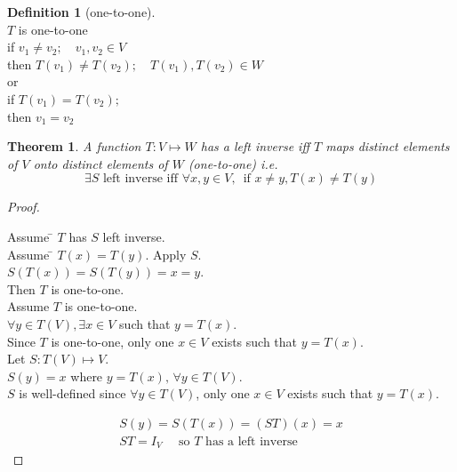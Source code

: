 \documentclass[twoside]{amsart}
\theoremstyle{plain}
\newtheorem{theorem}{Theorem}
\theoremstyle{definition}
\newtheorem{definition}{Definition}
\begin{document}
\begin{definition}[one-to-one] \quad \\
$T$ is one-to-one \\
\phantom{T} if $v_1 \neq v_2; \quad v_1, v_2 \in V $\\
\phantom{T if v} then $T(v_1) \neq T(v_2); \quad T(v_1), T(v_2) \in W$ \\
or \\
\phantom{T} if $T(v_1) = T(v_2);$ \\
\phantom{T if v} then $v_1 = v_2$ \\
\end{definition}

\begin{theorem}\label{T:Left_Inverse_equals_one-to-one}
A function $T:V \mapsto W$ has a left inverse iff $T$ maps distinct elements of $V$ onto distinct elements of $W$ (one-to-one) i.e.
\begin{equation}
\exists S \text{ left inverse iff } \forall x,y \in V, \, \text{ if } x \neq y, T(x) \neq T(y)
\end{equation}
\end{theorem}
\begin{proof} \quad \\
  \begin{tabbing}
    Assume \= $T$ has $S$ left inverse.  \\
    \> Assume \= $T(x) = T(y)$.  Apply $S$.  \\
    \> \> $S(T(x)) = S(T(y)) = x = y$.  \\
    \> Then $T$ is one-to-one.  \\
    Assume $T$ is one-to-one.  \\
    \> $\forall y \in T(V), \exists x \in V$ such that $y=T(x)$.  \\
    \> \> Since $T$ is one-to-one, only one $x \in V$ exists such that $y=T(x)$.  \\
    \> Let $S:T(V) \mapsto V$.  \\
    \> \> $S(y) = x $ where $y=T(x), \, \forall y \in T(V)$.  \\
    \> $S$ is well-defined since $\forall y \in T(V)$, only one $x \in V$ exists such that $y=T(x)$.  
  \end{tabbing}
  \begin{gather*}
    S(y) = S(T(x)) = (ST)(x) = x \\
    ST = I_V \quad \text{ so $T$ has a left inverse }
  \end{gather*}
\end{proof}
\end{document}
